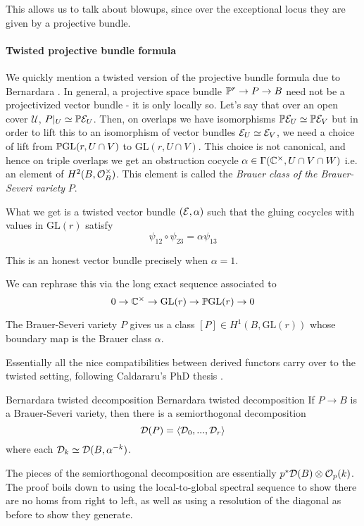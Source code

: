 This allows us to talk about blowups, since over the exceptional locus they are given by a projective bundle.

\paragraph*{Twisted projective bundle formula}
We quickly mention a twisted version of the projective bundle formula due to Bernardara \cite{bernardara_semiorthogonal_2005}. In general, a projective space bundle $\P^r \rightarrow P\rightarrow B$ need not be a projectivized vector bundle - it is only locally so. Let's say that over an open cover $\mathcal{U}$, $P|_U\simeq \P \calE_U$. Then, on overlaps we have isomorphisms $\P\calE_U \simeq \P \calE_V$ but in order to lift this to an isomorphism of vector bundles $\calE_U \simeq \calE_V$, we need a choice of lift from $\P\mathrm{GL}(r,U\cap V)$ to $\mathrm{GL}(r,U\cap V)$. This choice is not canonical, and hence on triple overlaps we get an obstruction cocycle $\alpha \in \Gamma(\C^\times, U\cap V \cap W)$ i.e. an element of $H^2(B,\O_B^\times)$. This element is called the \emph{Brauer class of the Brauer-Severi variety }$P$.

What we get is a twisted vector bundle $(\calE, \alpha)$ such that the gluing cocycles with values in $\mathrm{GL}(r)$ satisfy $$\psi_{12} \circ \psi_{23}=\alpha \psi_{13}$$

This is an honest vector bundle precisely when $\alpha=1$. 

We can rephrase this via the long exact sequence associated to $$0\rightarrow \C^\times \rightarrow \mathrm{GL}(r)\rightarrow \P \mathrm{GL}(r)\rightarrow 0$$

The Brauer-Severi variety $P$ gives us a class $[P]\in H^1(B, \mathrm{GL}(r))$ whose boundary map is the Brauer class $\alpha$. 

Essentially all the nice compatibilities between derived functors carry over to the twisted setting, following Caldararu's PhD thesis \cite{CaldararuThesis}. 

\begin{proposition}{Bernardara twisted decomposition \cite{bernardara_semiorthogonal_2005}}{Bernardara twisted decomposition}
    If $P\rightarrow B$ is a Brauer-Severi variety, then there is a semiorthogonal decomposition $$\calD(P)=\langle \calD_0,..., \calD_r\rangle$$
    where each $\calD_k\simeq \calD(B,\alpha^{-k})$.  
\end{proposition}

The pieces of the semiorthogonal decomposition are essentially $p^*\calD(B)\otimes \O_p(k)$. The proof boils down to using the local-to-global spectral sequence to show there are no homs from right to left, as well as using a resolution of the diagonal as before to show they generate.

